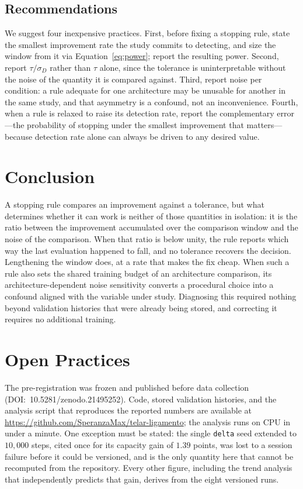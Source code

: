 \documentclass[jou,11pt,donotrepeattitle]{apa7}
\begin{document}
\subsection{Recommendations}

We suggest four inexpensive practices. First, before fixing a stopping rule, state the smallest
improvement rate the study commits to detecting, and size the window from it via
Equation~\ref{eq:power}; report the resulting power. Second, report $\tau/\sigma_D$ rather than
$\tau$ alone, since the tolerance is uninterpretable without the noise of the quantity it is
compared against. Third, report noise per condition: a rule adequate for one architecture may be
unusable for another in the same study, and that asymmetry is a confound, not an inconvenience.
Fourth, when a rule is relaxed to raise its detection rate, report the complementary error---the
probability of stopping under the smallest improvement that matters---because detection rate
alone can always be driven to any desired value.

\section{Conclusion}

A stopping rule compares an improvement against a tolerance, but what determines whether it can
work is neither of those quantities in isolation: it is the ratio between the improvement
accumulated over the comparison window and the noise of the comparison. When that ratio is
below unity, the rule reports which way the last evaluation happened to fall, and no tolerance
recovers the decision. Lengthening the window does, at a rate that makes the fix cheap. When such
a rule also sets the shared training budget of an architecture comparison, its
architecture-dependent noise sensitivity converts a procedural choice into a confound aligned
with the variable under study. Diagnosing this required nothing beyond validation histories that
were already being stored, and correcting it requires no additional training.

\section*{Open Practices}

The pre-registration was frozen and published before data collection
(DOI:~10.5281/zenodo.21495252). Code, stored validation histories, and the analysis script that
reproduces the reported numbers are available at
\url{https://github.com/SperanzaMax/telar-ligamento}; the analysis runs on CPU in under a
minute. One exception must be stated: the single \texttt{delta} seed extended to $10{,}000$
steps, cited once for its capacity gain of $1.39$ points, was lost to a session failure before
it could be versioned, and is the only quantity here that cannot be recomputed from the
repository. Every other figure, including the trend analysis that independently predicts that
gain, derives from the eight versioned runs.

\printbibliography
\end{document}
